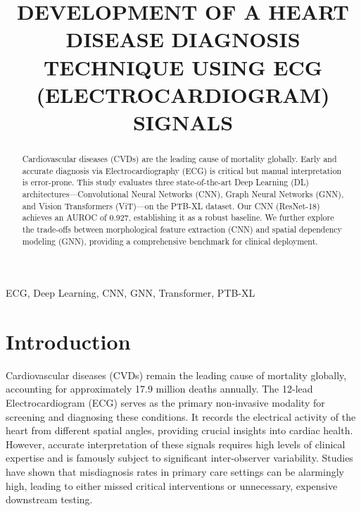 \documentclass[conference]{IEEEtran}
\begin{document}
\title{DEVELOPMENT OF A HEART DISEASE DIAGNOSIS TECHNIQUE USING ECG (ELECTROCARDIOGRAM) SIGNALS}

\author{
}

\maketitle

\begin{abstract}
Cardiovascular diseases (CVDs) are the leading cause of mortality globally. Early and accurate diagnosis via Electrocardiography (ECG) is critical but manual interpretation is error-prone. This study evaluates three state-of-the-art Deep Learning (DL) architectures---Convolutional Neural Networks (CNN), Graph Neural Networks (GNN), and Vision Transformers (ViT)---on the PTB-XL dataset. Our CNN (ResNet-18) achieves an AUROC of 0.927, establishing it as a robust baseline. We further explore the trade-offs between morphological feature extraction (CNN) and spatial dependency modeling (GNN), providing a comprehensive benchmark for clinical deployment.
\end{abstract}

\begin{IEEEkeywords}
ECG, Deep Learning, CNN, GNN, Transformer, PTB-XL
\end{IEEEkeywords}

\section{Introduction}

Cardiovascular diseases (CVDs) remain the leading cause of mortality globally, accounting for approximately 17.9 million deaths annually. The 12-lead Electrocardiogram (ECG) serves as the primary non-invasive modality for screening and diagnosing these conditions. It records the electrical activity of the heart from different spatial angles, providing crucial insights into cardiac health. However, accurate interpretation of these signals requires high levels of clinical expertise and is famously subject to significant inter-observer variability. Studies have shown that misdiagnosis rates in primary care settings can be alarmingly high, leading to either missed critical interventions or unnecessary, expensive downstream testing.
\end{document}
